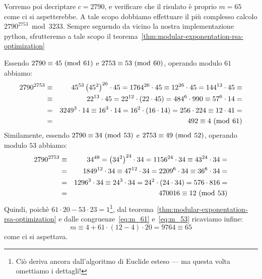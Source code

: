 \documentclass[pdflatex,11pt,a4paper,oneside]{article}
\newcommand{\p}[1]{\left({#1}\right)}
\newcommand{\congruent}[0]{\equiv}
\newcommand{\mmodop}[0]{\ensuremath{\operatorname{mod}}}
\newcommand{\mmod}[1]{\ensuremath{\allowbreak\ (\mmodop\:{#1})}}
\newcommand{\rem}[2]{\ensuremath{{#1}\:\mmodop\:{#2}}}
\begin{document}
\medskip
Vorremo poi decriptare $c = 2790$, e verificare che il risulato \`e
proprio $m = 65$ come ci si aspetterebbe. A tale scopo dobbiamo
effettuare il pi\`u complesso calcolo $\rem{2790^{2753}}{3233}$.
Sempre seguendo da vicino la nostra implementazione python, sfrutteremo a
tale scopo il teorema~\eqref{thm:modular-exponentation-rsa-optimization}

\smallskip
Essendo $2790 \congruent 45 \mmod{61}$ e $2753 \congruent 53 \mmod{60}$,
operando modulo $61$ abbiamo:
{
  \setlength\arraycolsep{2pt}
  \begin{eqnarray}
  2790^{2753}
    & \congruent &
      {45}^{53} \p{{45}^2}^{26} \cdot 45 = 1764^{26} \cdot 45 \congruent
      12^{26} \cdot 45 = 144^{13} \cdot 45 \congruent
    \nonumber\\
    & \congruent &
      22^{13} \cdot 45 = 22^{12} \cdot \p{22 \cdot 45} = {484}^6 \cdot 990
      \congruent {57}^6 \cdot 14 =
    \nonumber\\
    & = &
      3249^3 \cdot 14 \congruent 16^3 \cdot 14 = 16^2 \cdot \p{16 \cdot 14}
      = 256 \cdot 224 \congruent 12 \cdot 41 =
    \nonumber\\
    \label{eq:m_61}
    & = &
      492 \congruent 4 \mmod{61}
  \end{eqnarray}
  Similamente, essendo $2790 \congruent 34 \mmod{53}$ e
  $2753 \congruent 49 \mmod{52}$, operando modulo $53$ abbiamo:
  \begin{eqnarray}
  2790^{2753}
    & \congruent &
      {34}^{49} = \p{{34}^2}^{24} \cdot 34 = 1156^{24} \cdot 34
      \congruent 43^{24} \cdot 34 =
    \nonumber\\
    & = &
      1849^{12} \cdot 34 \congruent 47^{12} \cdot 34 = {2209}^6 \cdot 34
      \congruent 36^6 \cdot 34 =
    \nonumber\\
    & = &
      1296^3 \cdot 34 \congruent 24^3 \cdot 34 = 24^2 \cdot \p{24 \cdot 34}
      = 576 \cdot 816 =
    \nonumber\\
    \label{eq:m_53}
    & = &
      470016 \congruent 12 \mmod{53}
  \end{eqnarray}
}%
Quindi, poich\`e $61 \cdot 20 - 53 \cdot 23 = 1$\footnote{Ci\`o deriva
ancora dall'algoritmo di Euclide esteso --- ma questa volta omettiamo i
dettagli!}, dal teorema~\eqref{thm:modular-exponentation-rsa-optimization}
e dalle congruenze~\eqref{eq:m_61} e~\eqref{eq:m_53} ricaviamo infine:
\begin{displaymath}
  m \congruent 4 + 61 \cdot \p{12 - 4} \cdot 20 = 9764 \congruent 65
\end{displaymath}
come ci si aspettava.
\end{document}
